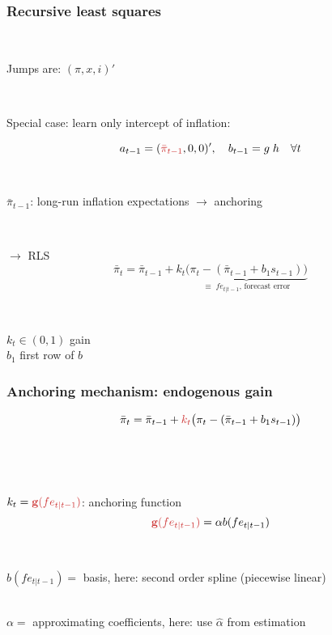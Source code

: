 \documentclass[10pt]{beamer}
\begin{document}
\begin{frame}
	\frametitle{Recursive least squares}
	\label{RLS_special}
	
	\
	
Jumps are: $(\pi, x, i)'$ 	

\
\pause
\

Special case: learn only intercept of inflation:

\begin{equation}
a_{t-1} = ( \textcolor{brownreddark}{\bar{\pi}_{t-1}},0,0)', \quad b_{t-1} = g\; h \quad \forall t
\end{equation}

\
\pause
\

 \textcolor{brownreddark}{$\bar{\pi}_{t-1}$}: long-run inflation expectations $\rightarrow$ anchoring

\
\pause
\

$\rightarrow$ RLS
\begin{equation}
\bar{\pi}_{t}  =\bar{\pi}_{t-1} +k_t \underbrace{\big(\pi_{t} -(\bar{\pi}_{t-1}+b_1 s_{t-1}) \big)}_{\equiv \; fe_{t|t-1} \text{, forecast error} } 
\end{equation}
 
 \
 
 $k_t \in (0,1)$ gain \\
 $b_1$ first row of $b$
\vfill 

\hfill \hyperlink{RLS}{}




\end{frame}

\begin{frame}
	\frametitle{Anchoring mechanism: endogenous gain}
	\label{anchoring1}


\begin{equation}
\bar{\pi}_{t}  =\bar{\pi}_{t-1} + \textcolor{brownreddark}{k_t}\big(\pi_{t} -(\bar{\pi}_{t-1}+b_1 s_{t-1}) \big)
\end{equation}

\

\

$k_t = \textcolor{brownreddark}{\mathbf{g}(fe_{t|t-1})}$: anchoring function
\pause
\begin{equation}
 \textcolor{brownreddark}{\mathbf{g}(fe_{t|t-1})} = \alpha b(fe_{t|t-1})\label{gain}
\end{equation}

\

$ b(fe_{t|t-1}) = $ basis, here: second order spline (piecewise linear) \\

\

$\alpha  = $ approximating coefficients, here: use $\hat{\alpha}$ from estimation

\vfill 

\hfill \hyperlink{g}{}



\end{frame}
\end{document}
